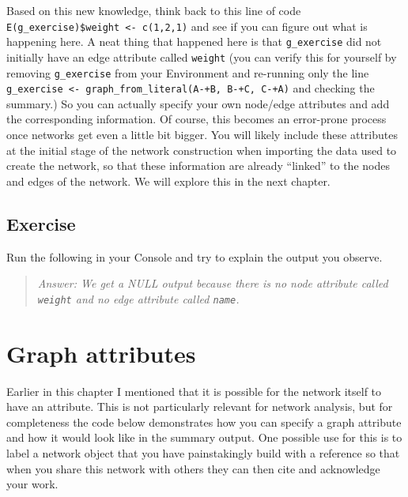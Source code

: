 \documentclass[
]{book}
\newenvironment{Shaded}{\begin{snugshade}}{\end{snugshade}}
\newcommand{\FunctionTok}[1]{\textcolor[rgb]{0.13,0.29,0.53}{\textbf{#1}}}
\newcommand{\NormalTok}[1]{#1}
\newcommand{\SpecialCharTok}[1]{\textcolor[rgb]{0.81,0.36,0.00}{\textbf{#1}}}
\begin{document}
Based on this new knowledge, think back to this line of code \texttt{E(g\_exercise)\$weight\ \textless{}-\ c(1,2,1)} and see if you can figure out what is happening here. A neat thing that happened here is that \texttt{g\_exercise} did not initially have an edge attribute called \texttt{weight} (you can verify this for yourself by removing \texttt{g\_exercise} from your Environment and re-running only the line \texttt{g\_exercise\ \textless{}-\ graph\_from\_literal(A-+B,\ B-+C,\ C-+A)} and checking the summary.) So you can actually specify your own node/edge attributes and add the corresponding information. Of course, this becomes an error-prone process once networks get even a little bit bigger. You will likely include these attributes at the initial stage of the network construction when importing the data used to create the network, so that these information are already ``linked'' to the nodes and edges of the network. We will explore this in the next chapter.

\subsection{Exercise}\label{exercise-2}

Run the following in your Console and try to explain the output you observe.

\begin{Shaded}
\end{Shaded}

\begin{quote}
\emph{Answer: We get a NULL output because there is no node attribute called \texttt{weight} and no edge attribute called \texttt{name}.}
\end{quote}

\section{Graph attributes}\label{graph-attributes}

Earlier in this chapter I mentioned that it is possible for the network itself to have an attribute. This is not particularly relevant for network analysis, but for completeness the code below demonstrates how you can specify a graph attribute and how it would look like in the summary output. One possible use for this is to label a network object that you have painstakingly build with a reference so that when you share this network with others they can then cite and acknowledge your work.
\end{document}
